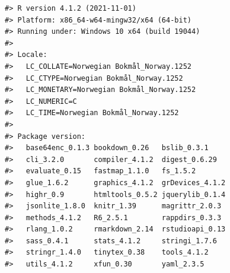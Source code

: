 \documentclass[
]{article}
\begin{document}
\begin{verbatim}
#> R version 4.1.2 (2021-11-01)
#> Platform: x86_64-w64-mingw32/x64 (64-bit)
#> Running under: Windows 10 x64 (build 19044)
#> 
#> Locale:
#>   LC_COLLATE=Norwegian Bokmål_Norway.1252 
#>   LC_CTYPE=Norwegian Bokmål_Norway.1252   
#>   LC_MONETARY=Norwegian Bokmål_Norway.1252
#>   LC_NUMERIC=C                            
#>   LC_TIME=Norwegian Bokmål_Norway.1252    
#> 
#> Package version:
#>   base64enc_0.1.3 bookdown_0.26   bslib_0.3.1    
#>   cli_3.2.0       compiler_4.1.2  digest_0.6.29  
#>   evaluate_0.15   fastmap_1.1.0   fs_1.5.2       
#>   glue_1.6.2      graphics_4.1.2  grDevices_4.1.2
#>   highr_0.9       htmltools_0.5.2 jquerylib_0.1.4
#>   jsonlite_1.8.0  knitr_1.39      magrittr_2.0.3 
#>   methods_4.1.2   R6_2.5.1        rappdirs_0.3.3 
#>   rlang_1.0.2     rmarkdown_2.14  rstudioapi_0.13
#>   sass_0.4.1      stats_4.1.2     stringi_1.7.6  
#>   stringr_1.4.0   tinytex_0.38    tools_4.1.2    
#>   utils_4.1.2     xfun_0.30       yaml_2.3.5
\end{verbatim}

  
\end{document}
